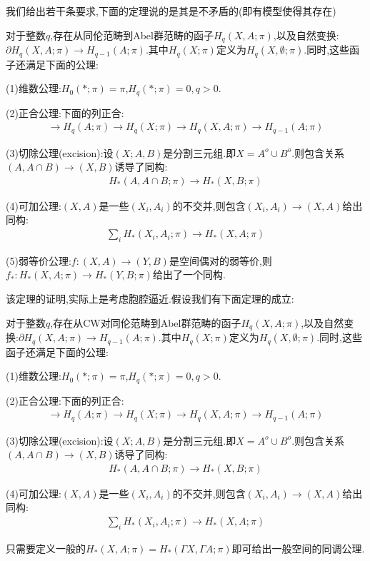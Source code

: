 我们给出若干条要求,下面的定理说的是其是不矛盾的(即有模型使得其存在)
\begin{theorem}[同调公理的存在性]
    对于整数$q$,存在从同伦范畴到Abel群范畴的函子$H_q(X,A;\pi)$,以及自然变换:$\partial H_q(X,A;\pi) \to H_{q-1}(A;\pi)$.其中$H_q(X;\pi)$定义为$H_q(X,\emptyset;\pi)$.同时,这些函子还满足下面的公理:
    
    (1)维数公理:$H_0(*;\pi)=\pi$,$H_q(*;\pi)=0,q>0$.

    (2)正合公理:下面的列正合:
    \begin{align*}
        \rightarrow H_q(A;\pi) \rightarrow H_q(X;\pi) \rightarrow H_q(X,A;\pi) \rightarrow H_{q-1}(A;\pi)
    \end{align*}

    (3)切除公理(excision):设$(X;A,B)$是分割三元组.即$X=A^o \cup B^o$.则包含关系$(A,A\cap B)\to (X,B)$诱导了同构:
    \begin{align*}
        H_*(A,A\cap B;\pi)\longrightarrow H_*(X,B;\pi)
    \end{align*}

    (4)可加公理:$(X,A)$是一些$(X_i,A_i)$的不交并,则包含$(X_i,A_i)\to (X,A)$给出同构:
    \begin{align*}
        \sum_i H_*(X_i,A_i;\pi)\to H_*(X,A;\pi)
    \end{align*}

    (5)弱等价公理:$f:(X,A)\to (Y,B)$是空间偶对的弱等价,则$f_*:H_*(X,A;\pi)\to H_*(Y,B;\pi)$给出了一个同构.
\end{theorem}
该定理的证明,实际上是考虑胞腔逼近.假设我们有下面定理的成立:
\begin{theorem}
    对于整数$q$,存在从CW对同伦范畴到Abel群范畴的函子$H_q(X,A;\pi)$,以及自然变换:$\partial H_q(X,A;\pi) \to H_{q-1}(A;\pi)$.其中$H_q(X;\pi)$定义为$H_q(X,\emptyset;\pi)$.同时,这些函子还满足下面的公理:
    
    (1)维数公理:$H_0(*;\pi)=\pi$,$H_q(*;\pi)=0,q>0$.

    (2)正合公理:下面的列正合:
    \begin{align*}
        \rightarrow H_q(A;\pi) \rightarrow H_q(X;\pi) \rightarrow H_q(X,A;\pi) \rightarrow H_{q-1}(A;\pi)
    \end{align*}

    (3)切除公理(excision):设$(X;A,B)$是分割三元组.即$X=A^o \cup B^o$.则包含关系$(A,A\cap B)\to (X,B)$诱导了同构:
    \begin{align*}
        H_*(A,A\cap B;\pi)\longrightarrow H_*(X,B;\pi)
    \end{align*}

    (4)可加公理:$(X,A)$是一些$(X_i,A_i)$的不交并,则包含$(X_i,A_i)\to (X,A)$给出同构:
    \begin{align*}
        \sum_i H_*(X_i,A_i;\pi)\to H_*(X,A;\pi)
    \end{align*}
\end{theorem}
只需要定义一般的$H_*(X,A;\pi)=H_*(\Gamma X,\Gamma A;\pi)$即可给出一般空间的同调公理.

